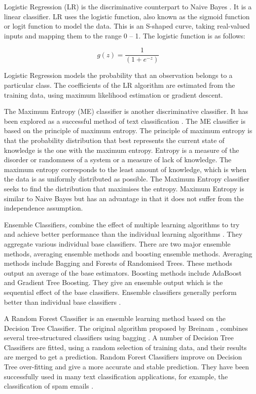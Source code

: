 Logistic Regression (LR) is the discriminative counterpart to Naive Bayes \cite{ng2002discriminative}. It is a linear classifier. LR uses the logistic function, also known as the sigmoid function or logit function to model the data. This is an S-shaped curve, taking real-valued inputs and mapping them to the range 0 – 1. The logistic function is as follows:

\begin{equation}
    g(z)= \frac{1}{(1+e^{-z})}
\end{equation}

Logistic Regression models the probability that an observation belongs to a particular class. The coefficients of the LR algorithm are estimated from the training data, using maximum likelihood estimation or gradient descent.

The Maximum Entropy (ME) classifier is another discriminative classifier. It has been explored as a successful method of text classification \cite{MaxEnt1999}. The ME classifier is based on the principle of maximum entropy. The principle of maximum entropy is that the probability distribution that best represents the current state of knowledge is the one with the maximum entropy. Entropy is a measure of the disorder or randomness of a system or a measure of lack of knowledge. The maximum entropy corresponds to the least amount of knowledge, which is when the data is as uniformly distributed as possible. The Maximum Entropy classifier seeks to find the distribution that maximises the entropy. Maximum Entropy is similar to Naive Bayes but has an advantage in that it does not suffer from the independence assumption.

Ensemble Classifiers, combine the effect of multiple learning algorithms to try and achieve better performance than the individual learning algorithms \cite{dietterich2000ensemble}. They aggregate various individual base classifiers. There are two major ensemble methods, averaging ensemble methods and boosting ensemble methods. Averaging methods include Bagging and Forests of Randomised Trees. These methods output an average of the base estimators. Boosting methods include AdaBoost and Gradient Tree Boosting. They give an ensemble output which is the sequential effect of the base classifiers. Ensemble classifiers generally perform better than individual base classifiers \cite{Opitz1999}. 

A Random Forest Classifier is an ensemble learning method based on the Decision Tree Classifier. The original algorithm proposed by Breinam \cite{Breiman2001}, combines several tree-structured classifiers using bagging \cite{breiman1996bagging}. A number of Decision Tree Classifiers are fitted, using a random selection of training data, and their results are merged to get a prediction. Random Forest Classifiers improve on Decision Tree over-fitting and give a more accurate and stable prediction. They have been successfully used in many text classification applications, for example, the classification of spam emails \cite{akinyelu2014}.

